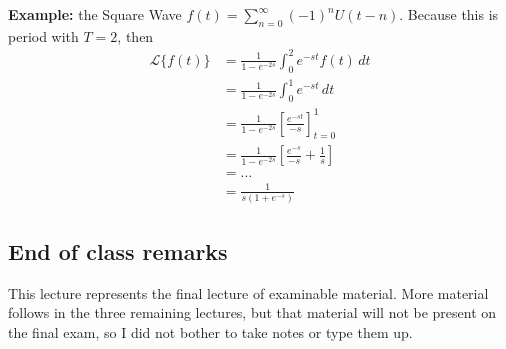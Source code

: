 \documentclass[11pt]{article}
\newcommand{\example}{\textbf{Example: }}
\newcommand{\lap}{\mathcal{L}}
\newcommand{\lapft}{\lap\{f(t)\}}
\begin{document}
	\example the Square Wave $f(t) = \sum_{n=0}^{\infty} (-1)^n U(t-n)$. Because this is period with $T=2$, then
		\begin{align*}
			\lapft &= \frac{1}{1 - e^{-2s}} \int_0^2 e^{-st} f(t) \,dt \\
				&= \frac{1}{1 - e^{-2s}} \int_0^1 e^{-st}\,dt \\
				&= \frac{1}{1 - e^{-2s}} \left[\frac{e^{-st}}{-s}\right]_{t=0}^1 \\
				&= \frac{1}{1 - e^{-2s}} \left[\frac{e^{-s}}{-s} + \frac{1}{s} \right] \\
				&= \ldots \\
				&= \frac{1}{s(1+e^{-s})}
		\end{align*}

\subsection{End of class remarks}
	This lecture represents the final lecture of examinable material. More material follows in the three remaining lectures, but that material will not be present on the final exam, so I did not bother to take notes or type them up.

\end{document}

